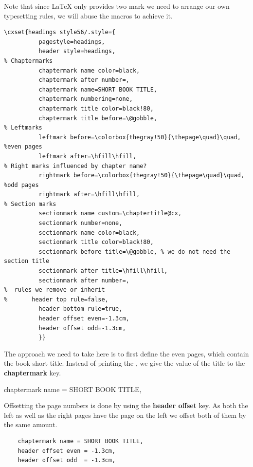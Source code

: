 Note that since LaTeX only provides two mark we need to arrange our own typesetting rules, we will abuse the macros to achieve it.

\begin{tcolorbox}
\begin{lstlisting}
\cxset{headings style56/.style={
          pagestyle=headings,
          header style=headings,
% Chaptermarks
          chaptermark name color=black,
          chaptermark after number=,
          chaptermark name=SHORT BOOK TITLE,
          chaptermark numbering=none,
          chaptermark title color=black!80,
          chaptermark title before=\@gobble,
% Leftmarks
          leftmark before=\colorbox{thegray!50}{\thepage\quad}\quad, %even pages
          leftmark after=\hfill\hfill,
% Right marks influenced by chapter name?
          rightmark before=\colorbox{thegray!50}{\thepage\quad}\quad, %odd pages
          rightmark after=\hfill\hfill,
% Section marks
          sectionmark name custom=\chaptertitle@cx,
          sectionmark number=none,
          sectionmark name color=black,
          sectionmark title color=black!80,
          sectionmark before title=\@gobble, % we do not need the section title
          sectionmark after title=\hfill\hfill,
          sectionmark after number=,
%  rules we remove or inherit
%       header top rule=false,
          header bottom rule=true,
          header offset even=-1.3cm,
          header offset odd=-1.3cm,
          }}
\end{lstlisting}
\end{tcolorbox}

The approach we need to take here is to first define the even pages, which contain the book short title. Instead of printing the , we give the value of the title to the \textbf{chaptermark} key.

\begin{tcolorbox}
   chaptermark name = SHORT BOOK TITLE,
\end{tcolorbox}

Offsetting the page numbers is done by using the \textbf{header offset} key. As both the left as well as the right pages have the page on the left we offset both of them by the same amount.

\begin{tcolorbox}
\begin{lstlisting}
    chaptermark name = SHORT BOOK TITLE,
    header offset even = -1.3cm,
    header offset odd  = -1.3cm,
\end{lstlisting}
\end{tcolorbox}

